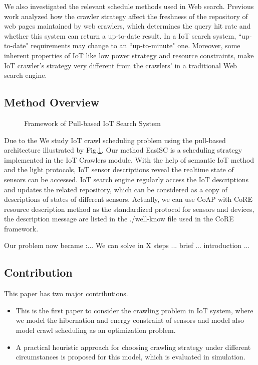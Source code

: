 \documentclass[conference]{IEEEtran}
\begin{document}
We also investigated the relevant schedule methods used in Web search. Previous work\cite{Cho2000}\cite{Wolf2002}\cite{Challenger2004} analyzed how the crawler strategy affect the freshness of the repository of web pages maintained by web crawlers, which determines the query hit rate and whether this system can return a up-to-date result. In a IoT search system, ``up-to-date" requirements may change to an ``up-to-minute" one. Moreover, some inherent properties of IoT like low power strategy and resource constraints, make IoT crawler's strategy very different from the crawlers' in a traditional Web search engine. 

\subsection{Method Overview}
\begin{figure}
	\centering
	
	\captionsetup{justification=centering}
	\caption{Framework of Pull-based IoT Search System}
	\label{fig:framework}
\end{figure}
Due to the 
We study IoT crawl scheduling problem using the pull-based architecture illustrated by Fig.\ref{fig:framework}. Our method EasiSC is a scheduling strategy implemented in the IoT Crawlers module. With the help of semantic IoT method and the light protocols, IoT sensor descriptions reveal the realtime state of sensors can be accessed. IoT search engine regularly access the IoT descriptions and updates the related repository, which can be considered as a copy of descriptions of states of different sensors. Actually, we can use CoAP with CoRE resource description method as the standardized protocol for sensors and devices, the description message are listed in the ./well-know file used in the CoRE framework.

Our problem now became :...
We can solve in X steps ... 
brief ... introduction ...


\subsection{Contribution}
This paper has two major contributions.
\begin{itemize}
\item This is the first paper to consider the crawling problem in IoT system, where we model the hibernation and energy constraint of sensors and model also model crawl scheduling as an optimization problem.
\item A practical heuristic approach for choosing crawling strategy under different circumstances is proposed for this model, which is evaluated in simulation.
\end{itemize}
\end{document}
